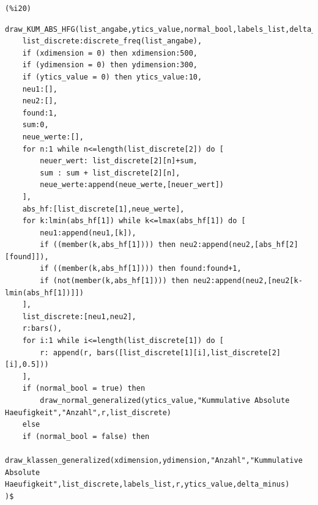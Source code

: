 \documentclass[12pt]{article}
\begin{document}
\noindent
\begin{minipage}[t]{8ex}{\color{red}\bf
\begin{verbatim}
(%i20) 
\end{verbatim}}
\end{minipage}
\begin{minipage}[t]{\textwidth}{\color{blue}
\begin{verbatim}
draw_KUM_ABS_HFG(list_angabe,ytics_value,normal_bool,labels_list,delta_minus,xdimension,ydimension):=block(
    list_discrete:discrete_freq(list_angabe),
    if (xdimension = 0) then xdimension:500,
    if (ydimension = 0) then ydimension:300,
    if (ytics_value = 0) then ytics_value:10,
    neu1:[],
    neu2:[],
    found:1,
    sum:0,
    neue_werte:[],
    for n:1 while n<=length(list_discrete[2]) do [
        neuer_wert: list_discrete[2][n]+sum,
        sum : sum + list_discrete[2][n],
        neue_werte:append(neue_werte,[neuer_wert])
    ],
    abs_hf:[list_discrete[1],neue_werte],
    for k:lmin(abs_hf[1]) while k<=lmax(abs_hf[1]) do [
        neu1:append(neu1,[k]),
        if ((member(k,abs_hf[1]))) then neu2:append(neu2,[abs_hf[2][found]]),
        if ((member(k,abs_hf[1]))) then found:found+1,
        if (not(member(k,abs_hf[1]))) then neu2:append(neu2,[neu2[k-lmin(abs_hf[1])]])
    ],  
    list_discrete:[neu1,neu2],
    r:bars(),
    for i:1 while i<=length(list_discrete[1]) do [
        r: append(r, bars([list_discrete[1][i],list_discrete[2][i],0.5]))
    ],
    if (normal_bool = true) then
        draw_normal_generalized(ytics_value,"Kummulative Absolute Haeufigkeit","Anzahl",r,list_discrete)
    else
    if (normal_bool = false) then
      draw_klassen_generalized(xdimension,ydimension,"Anzahl","Kummulative Absolute Haeufigkeit",list_discrete,labels_list,r,ytics_value,delta_minus)
)$
\end{verbatim}}
\end{minipage}
\end{document}
